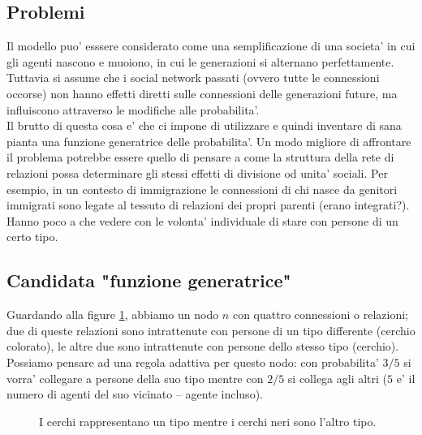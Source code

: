 \documentclass[12pt,titlepage]{article}
\begin{document}
\subsection*{Problemi}
Il modello puo' esssere considerato come una semplificazione di una societa' in cui gli agenti nascono e muoiono, in cui le generazioni si alternano perfettamente. Tuttavia si assume che i social network passati  (ovvero tutte le connessioni occorse) non hanno effetti diretti sulle connessioni delle generazioni future,  ma influiscono attraverso le modifiche alle probabilita'.\\
Il brutto di questa cosa e' che ci impone di utilizzare e quindi inventare di sana pianta una funzione generatrice delle probabilita'.  Un modo migliore di affrontare il problema potrebbe essere quello di pensare a come la struttura della rete di relazioni possa determinare gli stessi effetti di divisione od unita' sociali. Per esempio, in un contesto di immigrazione le connessioni di chi nasce da genitori immigrati sono legate al tessuto di relazioni dei propri parenti (erano integrati?). Hanno poco a che vedere con le volonta' individuale di stare con persone di un certo tipo.

\subsection*{Candidata "funzione generatrice"}
Guardando alla figure \ref{update}, abbiamo un nodo $n$ con quattro connessioni o relazioni; due di queste relazioni sono intrattenute con persone di un tipo differente (cerchio colorato), le altre due sono intrattenute con persone dello stesso tipo (cerchio). Possiamo pensare ad una regola adattiva per questo nodo: con probabilita' $3/5$ si vorra' collegare a persone della suo tipo mentre con $2/5$ si collega agli altri ($5$ e' il numero di agenti del suo vicinato -- agente incluso). 
 \begin{figure} 
\centering
{} 
 \caption{\label{update} I cerchi rappresentano un tipo mentre i cerchi neri sono l'altro tipo.}
\end{figure}


 
\end{document}

